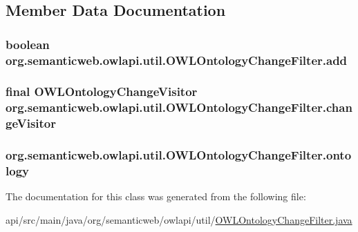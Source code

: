 \subsection{Member Data Documentation}
\hypertarget{classorg_1_1semanticweb_1_1owlapi_1_1util_1_1_o_w_l_ontology_change_filter_a8b310d9a157ce212d8c4a056ffa52977}{
\subsubsection[{add}]{\setlength{\rightskip}{0pt plus 5cm}boolean org.\-semanticweb.\-owlapi.\-util.\-O\-W\-L\-Ontology\-Change\-Filter.\-add\hspace{0.3cm}{\ttfamily [protected]}}}\label{classorg_1_1semanticweb_1_1owlapi_1_1util_1_1_o_w_l_ontology_change_filter_a8b310d9a157ce212d8c4a056ffa52977}
\hypertarget{classorg_1_1semanticweb_1_1owlapi_1_1util_1_1_o_w_l_ontology_change_filter_af1e78bf02701bb8b59aa6d527330daf6}{
\subsubsection[{change\-Visitor}]{\setlength{\rightskip}{0pt plus 5cm}final {\bf O\-W\-L\-Ontology\-Change\-Visitor} org.\-semanticweb.\-owlapi.\-util.\-O\-W\-L\-Ontology\-Change\-Filter.\-change\-Visitor\hspace{0.3cm}{\ttfamily [protected]}}}\label{classorg_1_1semanticweb_1_1owlapi_1_1util_1_1_o_w_l_ontology_change_filter_af1e78bf02701bb8b59aa6d527330daf6}
\hypertarget{classorg_1_1semanticweb_1_1owlapi_1_1util_1_1_o_w_l_ontology_change_filter_a36b96af05ab8665dfa2c22e4c593bb15}{
\subsubsection[{ontology}]{ org.\-semanticweb.\-owlapi.\-util.\-O\-W\-L\-Ontology\-Change\-Filter.\-ontology\hspace{0.3cm}{\ttfamily [protected]}}}\label{classorg_1_1semanticweb_1_1owlapi_1_1util_1_1_o_w_l_ontology_change_filter_a36b96af05ab8665dfa2c22e4c593bb15}


The documentation for this class was generated from the following file\-:\begin{DoxyCompactItemize}
\item 
api/src/main/java/org/semanticweb/owlapi/util/\hyperlink{_o_w_l_ontology_change_filter_8java}{O\-W\-L\-Ontology\-Change\-Filter.\-java}\end{DoxyCompactItemize}
